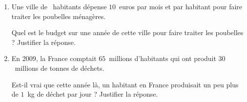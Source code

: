 
\medskip

\begin{enumerate}
\item Une ville de ~habitants dépense $10$~euros par mois et par habitant pour faire traiter les poubelles ménagères.
 
Quel est le budget sur une année de cette ville pour faire traiter les poubelles ? Justifier la réponse. 
\item En 2009, la France comptait $65$~millions d'habitants qui ont produit $30$~millions de tonnes de déchets.
 
Est-il vrai que cette année là, un habitant en France produisait un peu plus de $1$~kg de déchet par jour ? Justifier la réponse. 
\end{enumerate}

\bigskip

